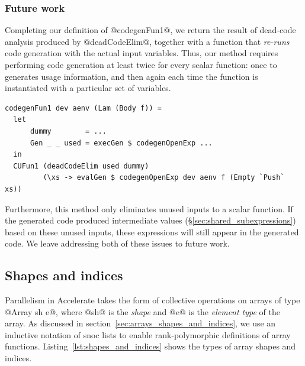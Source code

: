 \subsubsection{Future work}

Completing our definition of @codegenFun1@, we return the result of
dead-code analysis produced by @deadCodeElim@, together with a function
that \emph{re-runs} code generation with the actual input variables. Thus, our
method requires performing code generation at least twice for every scalar
function: once to generates usage information, and then again each time the
function is instantiated with a particular set of variables.
%
\begin{lstlisting}[style=haskell,firstnumber=7]
codegenFun1 dev aenv (Lam (Body f)) =
  let
      dummy        = ...
      Gen _ _ used = execGen $ codegenOpenExp ...
  in
  CUFun1 (deadCodeElim used dummy)
         (\xs -> evalGen $ codegenOpenExp dev aenv f (Empty `Push` xs))
\end{lstlisting}

Furthermore, this method only eliminates unused inputs to a scalar function. If
the generated code produced intermediate values
(\S\ref{sec:shared_subexpressions}) based on these unused inputs, these
expressions will still appear in the generated code. We leave addressing both of
these issues to future work.


\subsection{Shapes and indices}

Parallelism in Accelerate takes the form of collective operations on arrays of
type @Array sh e@, where @sh@ is the \emph{shape} and @e@ is the \emph{element
type} of the array. As discussed in section~\ref{sec:arrays_shapes_and_indices},
we use an inductive notation of snoc lists to enable rank-polymorphic
definitions of array functions. Listing~\ref{lst:shapes_and_indices} shows the
types of array shapes and indices.

